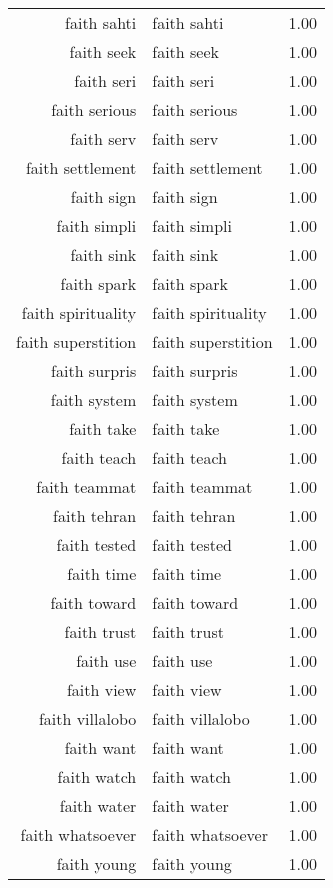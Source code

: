 \begin{table}[ht]
\begin{tabular}{rlr}
  faith sahti & faith sahti & 1.00 \\ 
  faith seek & faith seek & 1.00 \\ 
  faith seri & faith seri & 1.00 \\ 
  faith serious & faith serious & 1.00 \\ 
  faith serv & faith serv & 1.00 \\ 
  faith settlement & faith settlement & 1.00 \\ 
  faith sign & faith sign & 1.00 \\ 
  faith simpli & faith simpli & 1.00 \\ 
  faith sink & faith sink & 1.00 \\ 
  faith spark & faith spark & 1.00 \\ 
  faith spirituality & faith spirituality & 1.00 \\ 
  faith superstition & faith superstition & 1.00 \\ 
  faith surpris & faith surpris & 1.00 \\ 
  faith system & faith system & 1.00 \\ 
  faith take & faith take & 1.00 \\ 
  faith teach & faith teach & 1.00 \\ 
  faith teammat & faith teammat & 1.00 \\ 
  faith tehran & faith tehran & 1.00 \\ 
  faith tested & faith tested & 1.00 \\ 
  faith time & faith time & 1.00 \\ 
  faith toward & faith toward & 1.00 \\ 
  faith trust & faith trust & 1.00 \\ 
  faith use & faith use & 1.00 \\ 
  faith view & faith view & 1.00 \\ 
  faith villalobo & faith villalobo & 1.00 \\ 
  faith want & faith want & 1.00 \\ 
  faith watch & faith watch & 1.00 \\ 
  faith water & faith water & 1.00 \\ 
  faith whatsoever & faith whatsoever & 1.00 \\ 
  faith young & faith young & 1.00 \\ 
   \hline
\end{tabular}
\end{table}
